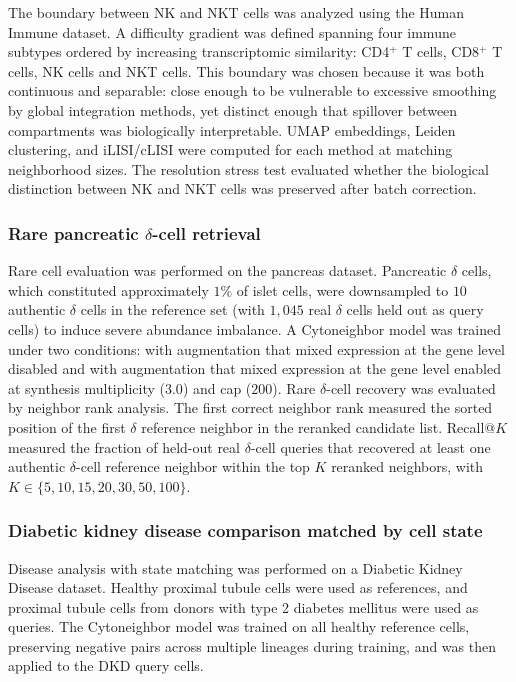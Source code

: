 \documentclass[11pt]{article}
\begin{document}
The boundary between NK and NKT cells was analyzed using the Human Immune dataset. A difficulty gradient was defined spanning four immune subtypes ordered by increasing transcriptomic similarity: CD4$^{+}$ T cells, CD8$^{+}$ T cells, NK cells and NKT cells. This boundary was chosen because it was both continuous and separable: close enough to be vulnerable to excessive smoothing by global integration methods, yet distinct enough that spillover between compartments was biologically interpretable. UMAP embeddings, Leiden clustering, and iLISI/cLISI were computed for each method at matching neighborhood sizes. The resolution stress test evaluated whether the biological distinction between NK and NKT cells was preserved after batch correction.

\subsubsection*{Rare pancreatic $\delta$-cell retrieval}

Rare cell evaluation was performed on the pancreas dataset. Pancreatic $\delta$ cells, which constituted approximately $1\%$ of islet cells, were downsampled to $10$ authentic $\delta$ cells in the reference set (with $1{,}045$ real $\delta$ cells held out as query cells) to induce severe abundance imbalance. A Cytoneighbor model was trained under two conditions: with augmentation that mixed expression at the gene level disabled and with augmentation that mixed expression at the gene level enabled at synthesis multiplicity ($3.0$) and cap ($200$). Rare $\delta$-cell recovery was evaluated by neighbor rank analysis. The first correct neighbor rank measured the sorted position of the first $\delta$ reference neighbor in the reranked candidate list. Recall@\(K\) measured the fraction of held-out real $\delta$-cell queries that recovered at least one authentic $\delta$-cell reference neighbor within the top \(K\) reranked neighbors, with \(K\in\{5,10,15,20,30,50,100\}\).

\subsubsection*{Diabetic kidney disease comparison matched by cell state}

Disease analysis with state matching was performed on a Diabetic Kidney Disease dataset. Healthy proximal tubule cells were used as references, and proximal tubule cells from donors with type 2 diabetes mellitus were used as queries. The Cytoneighbor model was trained on all healthy reference cells, preserving negative pairs across multiple lineages during training, and was then applied to the DKD query cells.
\end{document}
